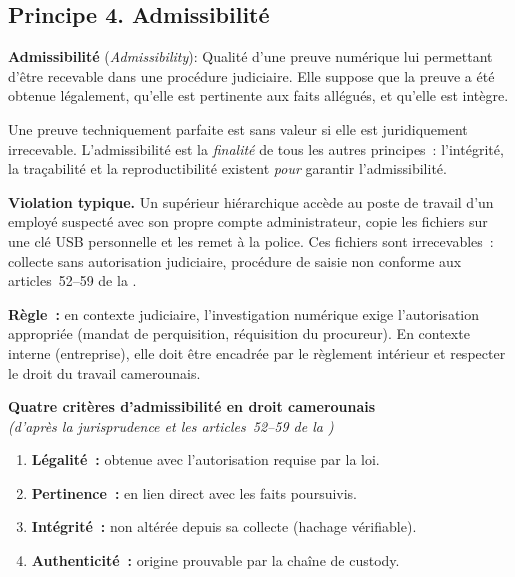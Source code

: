 \subsection{Principe 4. Admissibilité}
\label{subsec:principe-admissibilite}

\begin{boxdef}
\textbf{Admissibilité} (\textit{Admissibility}):
Qualité d'une preuve numérique lui permettant d'être recevable dans une
procédure judiciaire. Elle suppose que la preuve a été obtenue légalement,
qu'elle est pertinente aux faits allégués, et qu'elle est intègre.
\end{boxdef}

Une preuve techniquement parfaite est sans valeur si elle est juridiquement
irrecevable. L'admissibilité est la \emph{finalité} de tous les autres
principes~: l'intégrité, la traçabilité et la reproductibilité existent
\emph{pour} garantir l'admissibilité.

\begin{boxalert}
\textbf{Violation typique.} Un supérieur hiérarchique accède au poste de
travail d'un employé suspecté avec son propre compte administrateur, copie
les fichiers sur une clé USB personnelle et les remet à la police. Ces
fichiers sont irrecevables~: collecte sans autorisation judiciaire,
procédure de saisie non conforme aux articles~52--59 de la
.

\textbf{Règle~:} en contexte judiciaire, l'investigation numérique exige
l'autorisation appropriée (mandat de perquisition, réquisition du procureur).
En contexte interne (entreprise), elle doit être encadrée par le règlement
intérieur et respecter le droit du travail camerounais.
\end{boxalert}

\begin{boxjuris}
\textbf{Quatre critères d'admissibilité en droit camerounais}\\
\textit{(d'après la jurisprudence et les articles~52--59 de la )}

\begin{enumerate}
    \item \textbf{Légalité~:} obtenue avec l'autorisation requise par la loi.
    \item \textbf{Pertinence~:} en lien direct avec les faits poursuivis.
    \item \textbf{Intégrité~:} non altérée depuis sa collecte (hachage vérifiable).
    \item \textbf{Authenticité~:} origine prouvable par la chaîne de custody.
\end{enumerate}
\end{boxjuris}


